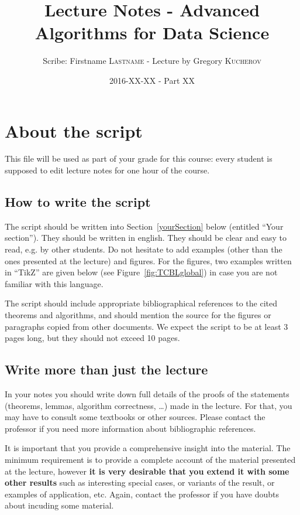 \documentclass{article}
\title{Lecture Notes - Advanced Algorithms for Data Science}
\author{Scribe: Firstname \textsc{Lastname} - Lecture by Gregory \textsc{Kucherov}}
\date{2016-XX-XX - Part XX}
\begin{document}
\maketitle

\section{About the script}

This file will be used as part of your grade
for this course: every student is supposed to edit
lecture notes for one hour of the course.

\subsection{How to write the script}

The script should be written into Section~\ref{yourSection}
below (entitled ``Your section''). They should be written in english. 
They should be clear and easy to read, e.g. by other students. 
Do not hesitate to add examples (other
than the ones presented at the lecture) and figures.
For the figures, two examples written in ``TikZ'' are
given below (see Figure~\ref{fig:TCBLglobal})
in case you are not familiar with this language.

The script should include appropriate bibliographical
references to the cited theorems and algorithms,
and should mention the source for the figures or paragraphs
copied from other documents.
We expect the script to be at least 3 pages long, but they should not
exceed 10 pages. 

\subsection{Write more than just the lecture}

In your notes you should write down full details of the proofs of the statements
(theorems, lemmas, algorithm correctness, \ldots) made in the
lecture. For that, you may have to consult some textbooks or other
sources. Please contact the professor if you need more information
about bibliographic references. 

It is important that you provide a comprehensive insight into the
material. The minimum requirement is to provide a complete account of
the material presented at the lecture, however {\bf it is very desirable
that you extend it with some other results} such as interesting
special cases, or variants of the result, or examples of
application, etc. Again, contact the professor if you have doubts
about incuding some material. 
\end{document}
